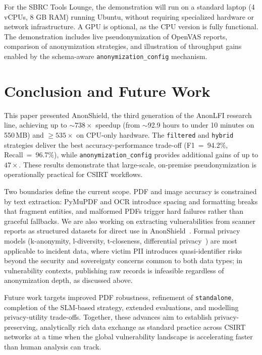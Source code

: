 \documentclass[12pt]{article}
\begin{document}
For the SBRC Tools Lounge, the demonstration will run on a standard laptop (4 vCPUs, 8 GB RAM) running Ubuntu, without requiring specialized hardware or network infrastructure. A GPU is optional, as the CPU version is fully functional. The demonstration includes live pseudonymization of OpenVAS reports, comparison of anonymization strategies, and illustration of throughput gains enabled by the schema-aware \texttt{anonymization\_config} mechanism.

\section{Conclusion and Future Work}
\label{sec:conclusion}

This paper presented AnonShield, the third generation of the AnonLFI research line, achieving up to ${\sim}738\times$ speedup (from ${\sim}$92.9 hours to under 10 minutes on 550\,MB) and ${\geq}535\times$ on CPU-only hardware. The \texttt{filtered} and \texttt{hybrid} strategies deliver the best accuracy-performance trade-off (F1~=~94.2\%, Recall~=~96.7\%), while \texttt{anonymization\_config} provides additional gains of up to $47\times$. These results demonstrate that large-scale, on-premise pseudonymization is operationally practical for CSIRT workflows.

Two boundaries define the current scope. PDF and image accuracy is constrained by text extraction: PyMuPDF and OCR introduce spacing and formatting breaks that fragment entities, and malformed PDFs trigger hard failures rather than graceful fallbacks. We are also working on extracting vulnerabilities from scanner reports as structured datasets for direct use in AnonShield~\cite{machado2025}. Formal privacy models (k-anonymity, l-diversity, t-closeness, differential privacy~\cite{sweeney2002k, machanavajjhala2007l, li2007t}) are most applicable to incident data, where victim PII introduces quasi-identifier risks beyond the security and sovereignty concerns common to both data types; in vulnerability contexts, publishing raw records is infeasible regardless of anonymization depth, as discussed above.

Future work targets improved PDF robustness, refinement of \texttt{standalone}, completion of the SLM-based strategy, extended evaluations, and modelling privacy-utility trade-offs. Together, these advances aim to establish privacy-preserving, analytically rich data exchange as standard practice across CSIRT networks at a time when the global vulnerability landscape is accelerating faster than human analysis can track.
\end{document}
